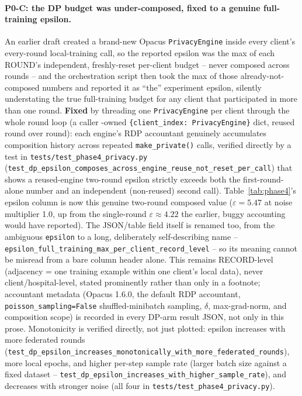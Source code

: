 \documentclass[11pt]{article}
\begin{document}
\paragraph{P0-C: the DP budget was under-composed, fixed to a genuine
full-training epsilon.} An earlier draft created a brand-new Opacus
\texttt{PrivacyEngine} inside every client's every-round local-training
call, so the reported epsilon was the max of each ROUND's independent,
freshly-reset per-client budget -- never composed across rounds -- and the
orchestration script then took the max of those already-not-composed
numbers and reported it as ``the'' experiment epsilon, silently
understating the true full-training budget for any client that
participated in more than one round. \textbf{Fixed} by threading one
\texttt{PrivacyEngine} per client through the whole round loop (a caller
-owned \texttt{\{client\_index: PrivacyEngine\}} dict, reused round over
round): each engine's RDP accountant genuinely accumulates composition
history across repeated \texttt{make\_private()} calls, verified directly
by a test in \texttt{tests/test\_phase4\_privacy.py}
(\texttt{test\_dp\_epsilon\_composes\_across\_engine\_reuse\_not\_reset\_per\_call})
that shows a reused-engine two-round epsilon strictly exceeds both the
first-round-alone number and an independent (non-reused) second call).
Table~\ref{tab:phase4}'s epsilon column is now this genuine two-round
composed value ($\varepsilon=5.47$ at noise multiplier 1.0, up from the
single-round $\varepsilon\approx4.22$ the earlier, buggy accounting would
have reported). The JSON/table field itself is renamed too, from the
ambiguous \texttt{epsilon} to a long, deliberately self-describing name --
\texttt{epsilon\_full\_training\_max\_per\_client\_record\_level} -- so its
meaning cannot be misread from a bare column header alone. This remains
RECORD-level (adjacency = one training example within one client's local
data), never client/hospital-level, stated prominently rather than only in
a footnote; accountant metadata (Opacus 1.6.0, the default RDP accountant,
\texttt{poisson\_sampling=False} shuffled-minibatch sampling, $\delta$,
max-grad-norm, and composition scope) is recorded in every DP-arm result
JSON, not only in this prose. Monotonicity is verified directly, not just
plotted: epsilon increases with more federated rounds
(\texttt{test\_dp\_epsilon\_increases\_monotonically\_with\_more\_federated\_rounds}),
more local epochs, and higher per-step sample rate (larger batch size
against a fixed dataset --
\texttt{test\_dp\_epsilon\_increases\_with\_higher\_sample\_rate}), and
decreases with stronger noise (all four in
\texttt{tests/test\_phase4\_privacy.py}).
\end{document}
